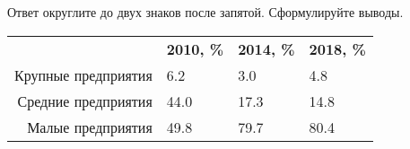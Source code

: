 \documentclass{article}
\begin{document}
Ответ округлите до двух знаков после запятой. Сформулируйте выводы.\\

\begin{minipage}{\textwidth}
\centering
\begin{tabularx}{0.8\textwidth}{rYYY}
\toprule
 & \textbf{2010, \%} & \textbf{2014, \%} & \textbf{2018, \%} \\
\cmidrule(lr){2-2}\cmidrule(lr){3-3}\cmidrule(lr){4-4}
Крупные предприятия & 6.2 & 3.0 & 4.8 \\

Средние предприятия & 44.0 & 17.3 & 14.8 \\

Малые предприятия & 49.8 & 79.7 & 80.4 \\
\bottomrule
\end{tabularx}
\label{task2}
\end{minipage} \\[35pt]
\end{document}
